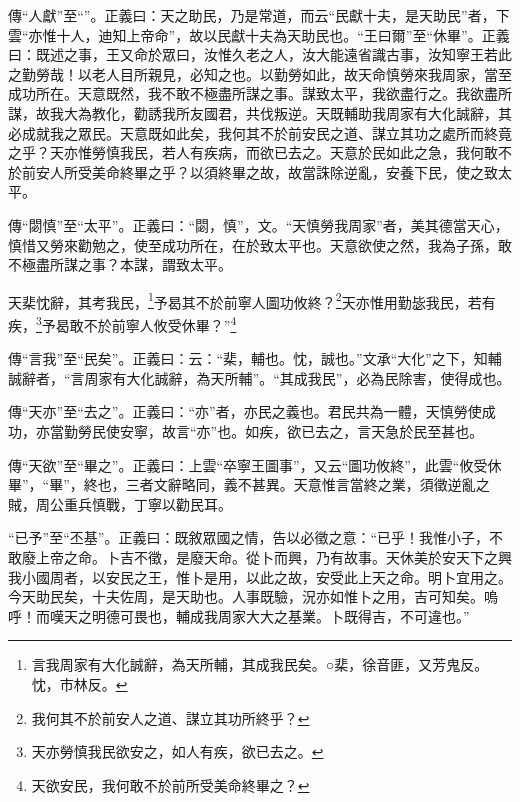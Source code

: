 {\noindent\zhuan{}\fzbyks 傳“人獻”至“”。正義曰：天之助民，乃是常道，而云“民獻十夫，是天助民”者，下雲“亦惟十人，迪知上帝命”，故以民獻十夫為天助民也。“王曰爾”至“休畢”。正義曰：既述之事，王又命於眾曰，汝惟久老之人，汝大能遠省識古事，汝知寧王若此之勤勞哉！以老人目所親見，必知之也。以勤勞如此，故天命慎勞來我周家，當至成功所在。天意既然，我不敢不極盡所謀之事。謀致太平，我欲盡行之。我欲盡所謀，故我大為教化，勸誘我所友國君，共伐叛逆。天既輔助我周家有大化誠辭，其必成就我之眾民。天意既如此矣，我何其不於前安民之道、謀立其功之處所而終竟之乎？天亦惟勞慎我民，若人有疾病，而欲已去之。天意於民如此之急，我何敢不於前安人所受美命終畢之乎？以須終畢之故，故當誅除逆亂，安養下民，使之致太平。 \par}

{\noindent\zhuan{}\fzbyks 傳“閟慎”至“太平”。正義曰：“閟，慎”，文。“天慎勞我周家”者，美其德當天心，慎惜又勞來勸勉之，使至成功所在，在於致太平也。天意欲使之然，我為子孫，敢不極盡所謀之事？本謀，謂致太平。 \par}

天棐忱辭，其考我民，\footnote{言我周家有大化誠辭，為天所輔，其成我民矣。○棐，徐音匪，又芳鬼反。忱，市林反。}予曷其不於前寧人圖功攸終？\footnote{我何其不於前安人之道、謀立其功所終乎？}天亦惟用勤毖我民，若有疾，\footnote{天亦勞慎我民欲安之，如人有疾，欲已去之。}予曷敢不於前寧人攸受休畢？”\footnote{天欲安民，我何敢不於前所受美命終畢之？}

{\noindent\zhuan{}\fzbyks 傳“言我”至“民矣”。正義曰：云：“棐，輔也。忱，誠也。”文承“大化”之下，知輔誠辭者，“言周家有大化誠辭，為天所輔”。“其成我民”，必為民除害，使得成也。 \par}

{\noindent\zhuan{}\fzbyks 傳“天亦”至“去之”。正義曰：“亦”者，亦民之義也。君民共為一體，天慎勞使成功，亦當勤勞民使安寧，故言“亦”也。如疾，欲已去之，言天急於民至甚也。 \par}

{\noindent\zhuan{}\fzbyks 傳“天欲”至“畢之”。正義曰：上雲“卒寧王圖事”，又云“圖功攸終”，此雲“攸受休畢”，“畢”，終也，三者文辭略同，義不甚異。天意惟言當終之業，須徵逆亂之賊，周公重兵慎戰，丁寧以勸民耳。 \par}

{\noindent\shu{}\fzkt “已予”至“丕基”。正義曰：既敘眾國之情，告以必徵之意：“已乎！我惟小子，不敢廢上帝之命。卜吉不徵，是廢天命。從卜而興，乃有故事。天休美於安天下之興我小國周者，以安民之王，惟卜是用，以此之故，安受此上天之命。明卜宜用之。今天助民矣，十夫佐周，是天助也。人事既驗，況亦如惟卜之用，吉可知矣。嗚呼！而嘆天之明德可畏也，輔成我周家大大之基業。卜既得吉，不可違也。” \par}

